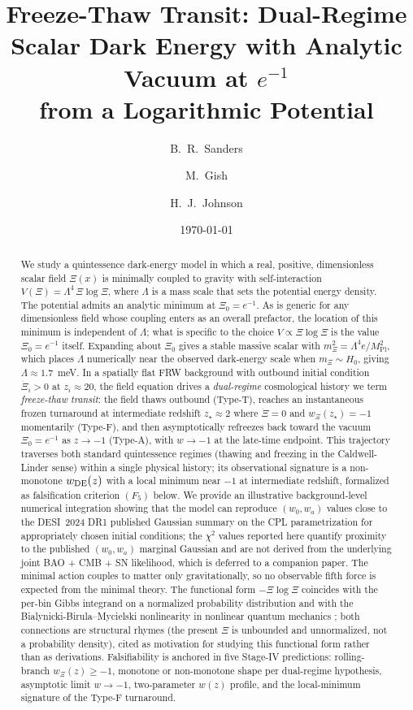 \documentclass[11pt,reqno]{amsart}
\title[Freeze-Thaw Transit]{Freeze-Thaw Transit: Dual-Regime\\
Scalar Dark Energy with Analytic Vacuum at $e^{-1}$\\
from a Logarithmic Potential}
\author{B.~R.~Sanders}
\author{M.~Gish}
\author{H.~J.~Johnson}
\date{\today}
\theoremstyle{plain}
\theoremstyle{definition}
\theoremstyle{remark}
\newcommand{\Pl}{\mathrm{Pl}}
\begin{document}
\begin{abstract}
We study a quintessence dark-energy model in which a real, positive,
dimensionless scalar field $\Xi(x)$ is minimally coupled to gravity with
self-interaction $V(\Xi) = \Lambda^{4}\,\Xi\log\Xi$, where $\Lambda$ is a
mass scale that sets the potential energy density. The potential admits an
analytic minimum at $\Xi_0 = e^{-1}$. As is generic for any dimensionless
field whose coupling enters as an overall prefactor, the location of this
minimum is independent of $\Lambda$; what is specific to the choice
$V \propto \Xi\log\Xi$ is the value $\Xi_0 = e^{-1}$ itself. Expanding about
$\Xi_0$ gives a stable massive scalar with
$m_\Xi^{2} = \Lambda^{4} e / M_\Pl^{2}$, which places $\Lambda$ numerically
near the observed dark-energy scale when $m_\Xi \sim H_0$, giving
$\Lambda \approx 1.7$~meV. In a spatially flat FRW background with
outbound initial condition $\dot\Xi_i > 0$ at $z_i \approx 20$, the field
equation drives a \emph{dual-regime} cosmological history we term
\emph{freeze-thaw transit}: the field thaws outbound (Type-T), reaches
an instantaneous frozen turnaround at intermediate redshift $z_\star
\approx 2$ where $\dot\Xi = 0$ and $w_\Xi(z_\star) = -1$ momentarily
(Type-F), and then asymptotically refreezes back toward the vacuum
$\Xi_0 = e^{-1}$ as $z \to -1$ (Type-A), with $w \to -1$ at the late-time
endpoint. This trajectory traverses both standard quintessence regimes
(thawing and freezing in the Caldwell-Linder \cite{CaldwellLinder2005}
sense) within a single physical history; its observational signature is
a non-monotone $w_{\rm DE}(z)$ with a local minimum near $-1$ at
intermediate redshift, formalized as falsification criterion $(F_5)$
below. We provide an illustrative background-level numerical integration
showing that the model can reproduce $(w_0, w_a)$ values close to the
DESI~2024 DR1 published Gaussian summary on the CPL parametrization for
appropriately chosen initial conditions; the $\chi^{2}$ values reported
here quantify proximity to the published $(w_0, w_a)$ marginal Gaussian
and are not derived from the underlying joint BAO + CMB + SN likelihood,
which is deferred to a companion paper. The minimal action couples to
matter only gravitationally, so no observable fifth force is expected
from the minimal theory. The functional form $-\Xi\log\Xi$ coincides
with the per-bin Gibbs integrand on a normalized probability
distribution and with the Bialynicki-Birula--Mycielski nonlinearity in
nonlinear quantum mechanics \cite{BialynickiBirulaMycielski1976}; both
connections are structural rhymes (the present $\Xi$ is unbounded and
unnormalized, not a probability density), cited as motivation for
studying this functional form rather than as derivations.
Falsifiability is anchored in five Stage-IV predictions: rolling-branch
$w_\Xi(z) \geq -1$, monotone or non-monotone shape per dual-regime
hypothesis, asymptotic limit $w \to -1$, two-parameter $w(z)$ profile,
and the local-minimum signature of the Type-F turnaround.
\end{abstract}
\end{document}
